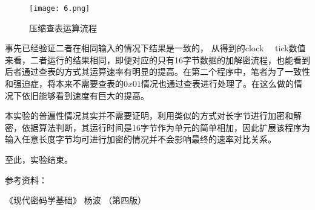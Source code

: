 \documentclass[UTF8]{ctexart}
\begin{document}
\begin{figure}[htb]
  \centering
  \texttt{[image: 6.png]} 
  \caption{压缩查表运算流程} 
  \label{img} 
\end{figure}
事先已经验证二者在相同输入的情况下结果是一致的，
从得到的clock \ \ tick数值来看，二者运行的结果相同，即便对应的只有16字节数据的加解密流程，也能看到后者通过查表的方式其运算速率有明显的提高。在第二个程序中，笔者为了一致性和强迫症，将本来不需要查表的$0x01$情况也通过查表进行处理了。在这么做的情况下依旧能够看到速度有巨大的提高。

本实验的普遍性情况其实并不需要证明，利用类似的方式对长字节进行加密和解密，依据算法判断，其运行时间是16字节作为单元的简单相加，因此扩展该程序为输入任意长度字节均可进行加密的情况并不会影响最终的速率对比关系。

至此，实验结束。

参考资料：

《现代密码学基础》 杨波 （第四版）
\end{document}
